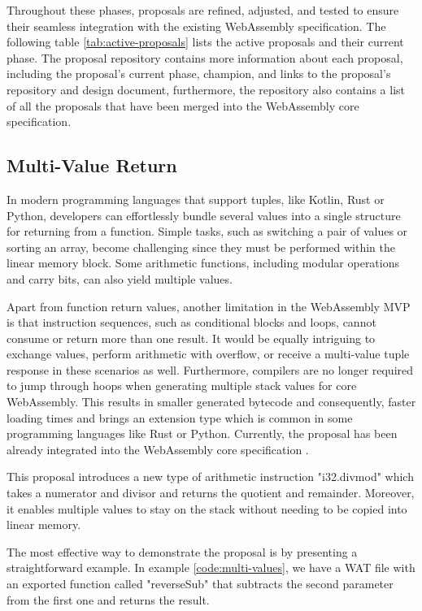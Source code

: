 Throughout these phases, proposals are refined, adjusted, and tested to ensure their seamless integration with the existing WebAssembly specification. The following table \ref{tab:active-proposals} lists the active proposals and their current phase. The proposal repository \cite{webassemblywg_2023_webassembly} contains more information about each proposal, including the proposal's current phase, champion, and links to the proposal's repository and design document, furthermore, the repository also contains a list of all the proposals that have been merged into the WebAssembly core specification.



\subsection{Multi-Value Return}
In modern programming languages that support tuples, like Kotlin, Rust or Python, developers can effortlessly bundle several values into a single structure for returning from a function. 
Simple tasks, such as switching a pair of values or sorting an array, become challenging since they must be performed within the linear memory block. 
Some arithmetic functions, including modular operations and carry bits, can also yield multiple values.

Apart from function return values, another limitation in the WebAssembly MVP is that instruction sequences, such as conditional blocks and loops, cannot consume or return more than one result. 
It would be equally intriguing to exchange values, perform arithmetic with overflow, or receive a multi-value tuple response in these scenarios as well. 
Furthermore, compilers are no longer required to jump through hoops when generating multiple stack values for core WebAssembly. This results in smaller generated bytecode and consequently, faster loading times and brings an extension type which is common in some programming languages like Rust or Python. Currently, the proposal has been already integrated into the WebAssembly core specification \cite{webassemblywg_2023_webassembly}. 

This proposal introduces a new type of arithmetic instruction "i32.divmod" which takes a numerator and divisor and returns the quotient and remainder. Moreover, it enables multiple values to stay on the stack without needing to be copied into linear memory.

The most effective way to demonstrate the proposal is by presenting a straightforward example. In example \ref{code:multi-values}, we have a WAT file with an exported function called "reverseSub" that subtracts the second parameter from the first one and returns the result. 

